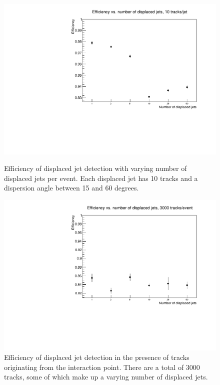 \documentclass[preprint,sort&compress]{elsarticle}
\begin{document}
\begin{figure}[!Hhtb]
\begin{minipage}[t]{5.6cm}
\begin{center}
\includegraphics[width=1.\textwidth]{eff_num_jets.pdf} 
 \caption{Efficiency of displaced jet detection with varying number of displaced jets per event.  
Each displaced jet has 10 tracks and a dispersion angle between 15 and 60 degrees.  \label{fig:eff_num_jets}}
\end{center}
\end{minipage}\quad
\begin{minipage}[t]{5.7cm}
\begin{center}
\includegraphics[width=1.\textwidth]{eff_jets_plus_tracks.pdf}  
\caption{Efficiency of displaced jet detection in the presence of tracks originating from the interaction point.  
There are a total of 3000 tracks, some of which make up a varying number of displaced jets. \label{fig:eff_jets_plus_tracks}}
\end{center}
\end{minipage}
\end{figure}
\end{document}
